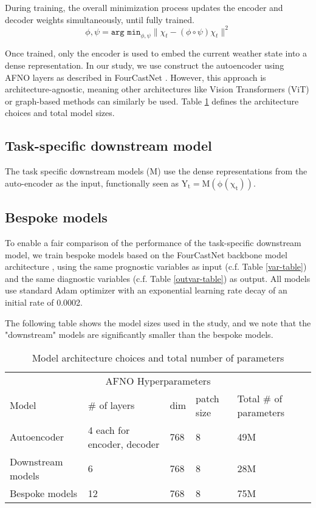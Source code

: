 \documentclass{article}
\begin{document}
During training, the overall minimization process updates the encoder and decoder weights simultaneously, until fully trained.
\begin{equation}
    \phi, \psi = \texttt{arg min}_{\phi, \psi} \lVert \chi_{t} - (\phi \circ \psi) \chi_{t} \rVert ^2
\end{equation}

Once trained, only the encoder is used to embed the current weather state into a dense representation. In our study, we use construct the autoencoder using AFNO layers as described in FourCastNet \cite{pathak2022fourcastnet}. However, this approach is architecture-agnostic, meaning other architectures like Vision Transformers (ViT) or graph-based methods can similarly be used. Table \ref{model-table} defines the architecture choices and total model sizes.

\subsection{Task-specific downstream model}

The task specific downstream models ($\mathrm{M}$) use the dense representations from the auto-encoder as the input, functionally seen as $\mathrm{Y_{t} = M(\phi(\chi_{t}))}$.

\subsection{Bespoke models}

To enable a fair comparison of the performance of the task-specific downstream model, we train bespoke models based on the FourCastNet backbone model architecture \cite{pathak2022fourcastnet}, using the same prognostic variables as input (c.f. Table \ref{var-table}) and the same diagnostic variables (c.f. Table \ref{outvar-table}) as output. All models use standard Adam \cite{kingma2014adam} optimizer with an exponential learning rate decay of an initial rate of 0.0002.

The following table shows the model sizes used in the study, and we note that the "downstream" models are significantly smaller than the bespoke models.

\begin{table}[ht]
  \caption{Model architecture choices and total number of parameters}
  \label{model-table}
  \centering
  \begin{tabular}{lllll}
    \toprule
    \multicolumn{5}{c}{AFNO Hyperparameters}                   \\
    \cmidrule(r){2-5}
    Model     & \# of layers &  dim  & patch size   & Total \# of parameters \\
    \midrule
    Autoencoder        & 4 each for encoder, decoder   & 768  & 8  & 49M     \\
    Downstream models  & 6        & 768  & 8 & 28M     \\
    Bespoke models     & 12       & 768  & 8 & 75M  \\
    \bottomrule
  \end{tabular}
\end{table}
\end{document}
